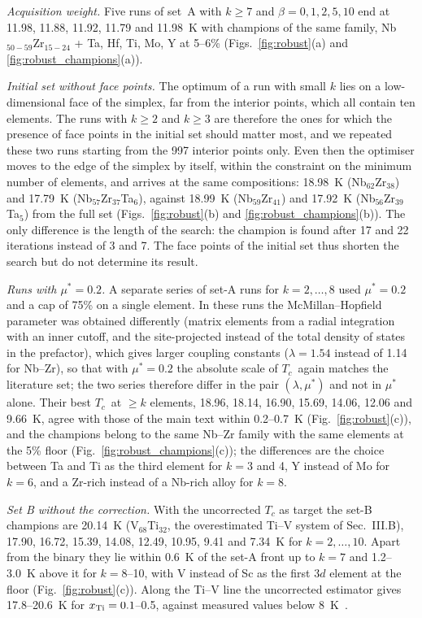 \documentclass[aps,prb,preprint,superscriptaddress,floatfix]{revtex4-2}
\newcommand{\Tc}{$T_c$}
\begin{document}
\emph{Acquisition weight.} Five runs of set~A with $k \geq 7$ and $\beta = 0, 1, 2, 5, 10$
end at 11.98, 11.88, 11.92, 11.79 and 11.98~K with champions of the same family,
Nb$_{50-59}$Zr$_{15-24}$ + Ta, Hf, Ti, Mo, Y at 5--6\% (Figs.~\ref{fig:robust}(a) and
\ref{fig:robust_champions}(a)).

\emph{Initial set without face points.} The optimum of a run with small $k$ lies on a
low-dimensional face of the simplex, far from the interior points, which all contain ten
elements. The runs with $k \geq 2$ and $k \geq 3$ are therefore the ones for which the
presence of face points in the initial set should matter most, and we repeated these two
runs starting from the 997 interior points only. Even then the optimiser moves to the edge of
the simplex by itself, within the constraint on the minimum number of elements, and arrives
at the same compositions: 18.98~K (Nb$_{62}$Zr$_{38}$) and 17.79~K
(Nb$_{57}$Zr$_{37}$Ta$_6$), against 18.99~K (Nb$_{59}$Zr$_{41}$) and 17.92~K
(Nb$_{56}$Zr$_{39}$Ta$_5$) from the full set (Figs.~\ref{fig:robust}(b) and
\ref{fig:robust_champions}(b)). The only difference is the length of the search: the
champion is found after 17 and 22 iterations instead of 3 and 7. The face points of the
initial set thus shorten the search but do not determine its result.

\emph{Runs with $\mu^* = 0.2$.} A separate series of set-A runs for $k = 2, \dots, 8$ used
$\mu^* = 0.2$ and a cap of 75\% on a single element. In these runs the McMillan--Hopfield
parameter was obtained differently (matrix elements from a radial integration with an inner
cutoff, and the site-projected instead of the total density of states in the prefactor),
which gives larger coupling constants ($\lambda = 1.54$ instead of 1.14 for Nb--Zr), so that
with $\mu^* = 0.2$ the absolute scale of \Tc\ again matches the literature set; the two
series therefore differ in the pair $(\lambda, \mu^*)$ and not in $\mu^*$ alone. Their best
\Tc\ at $\geq k$ elements, 18.96, 18.14, 16.90, 15.69, 14.06, 12.06 and 9.66~K, agree with
those of the main text within 0.2--0.7~K (Fig.~\ref{fig:robust}(c)), and the champions belong
to the same Nb--Zr family with the same elements at the 5\% floor
(Fig.~\ref{fig:robust_champions}(c)); the differences are the choice between Ta and Ti as
the third element for $k = 3$ and 4, Y instead of Mo for $k = 6$, and a Zr-rich instead of
a Nb-rich alloy for $k = 8$.

\emph{Set B without the correction.} With the uncorrected $T_c$ as target the set-B champions
are 20.14~K (V$_{68}$Ti$_{32}$, the overestimated Ti--V system of Sec.~III.B), 17.90, 16.72,
15.39, 14.08, 12.49, 10.95, 9.41 and 7.34~K for $k = 2, \dots, 10$. Apart from the binary they
lie within 0.6~K of the set-A front up to $k = 7$ and 1.2--3.0~K above it for $k = 8$--10,
with V instead of Sc as the first 3$d$ element at the floor (Fig.~\ref{fig:robust}(c)).
Along the Ti--V line the uncorrected estimator gives 17.8--20.6~K for $x_{\rm Ti} =
0.1$--0.5, against measured values below 8~K~\cite{Matin2014}.
\end{document}
